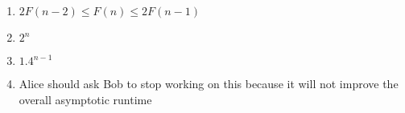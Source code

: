 \documentclass[11pt]{article}
\begin{document}
\begin{enumerate}
    \item $2F(n-2) \leq F(n) \leq 2F(n-1)$
    \item $2^n$
    \item $1.4^{n-1}$
    \item Alice should ask Bob to stop working on this because it will not improve the overall asymptotic runtime
\end{enumerate}
\end{document}
